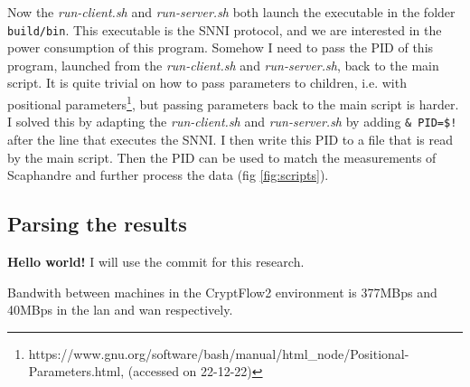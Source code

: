 \documentclass[../thesis.tex]{subfiles}
\begin{document}
Now the \textit{run-client.sh} and \textit{run-server.sh} both launch the executable in the folder \verb|build/bin|. This executable is the SNNI protocol, and we are interested in the power consumption of this program. Somehow I need to pass the PID of this program, launched from the \textit{run-client.sh} and \textit{run-server.sh}, back to the main script. It is quite trivial on how to pass parameters to children, i.e. with positional parameters\footnote{https://www.gnu.org/software/bash/manual/html_node/Positional-Parameters.html, (accessed on 22-12-22)}, but passing parameters back to the main script is harder. I solved this by adapting the \textit{run-client.sh} and \textit{run-server.sh} by adding \verb|& PID=$!| after the line that executes the SNNI. I then write this PID to a file that is read by the main script. Then the PID can be used to match the measurements of Scaphandre and further process the data (fig \ref{fig:scripts}). 



\subsection{Parsing the results}

\textbf{Hello world!}
I will use the commit  for this research.

Bandwith between machines in the CryptFlow2 environment is 377MBps and 40MBps in the lan and wan respectively. 
\end{document}
